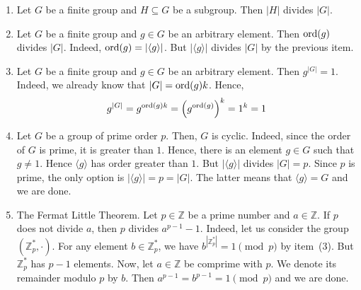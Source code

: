 \begin{enumerate}
\item Let $G$ be a finite group and $H\subseteq G$ be a subgroup.
Then $|H|$ divides $|G|$.

\item Let $G$ be a finite group and $g\in G$ be an arbitrary element.
Then $\operatorname{ord}(g)$ divides $|G|$.
Indeed, $\operatorname{ord}(g) = |\langle g \rangle|$.
But $|\langle g\rangle|$ divides $|G|$ by the previous item.

\item Let $G$ be a finite group and $g\in G$ be an arbitrary element.
Then $g^{|G|} = 1$.
Indeed, we already know that $|G| = \operatorname{ord}(g) k$.
Hence, 
\[
g^{|G|} = g^{\operatorname{ord}(g)k} = \left(g^{\operatorname{ord}(g)}\right)^{k} = 1^k = 1
\]

\item Let $G$ be a group of prime order $p$.
Then, $G$ is cyclic.
Indeed, since the order of $G$ is prime, it is greater than $1$.
Hence, there is an element $g\in G$ such that $g\neq 1$.
Hence $\langle g\rangle$ has order greater than $1$.
But $|\langle g \rangle|$ divides $|G| = p$.
Since $p$ is prime, the only option is $|\langle g \rangle| = p = |G|$.
The latter means that $\langle g \rangle = G$ and we are done.

\item The Fermat Little Theorem.
Let $p\in \mathbb Z$ be a prime number and $a\in \mathbb Z$.
If $p$ does not divide $a$, then $p$ divides $a^{p-1}-1$.
Indeed, let us consider the group $(\mathbb Z_p^*, \cdot)$.
For any element $b\in \mathbb Z_p^*$, we have $b^{|\mathbb Z_p^*|} = 1 \pmod p$ by item~(3).
But $\mathbb Z_p^*$ has $p-1$ elements.
Now, let $a\in \mathbb Z$ be comprime with $p$.
We denote its remainder modulo $p$ by $b$.
Then $a^{p-1} = b^{p-1} = 1\pmod p$ and we are done.
\end{enumerate}
